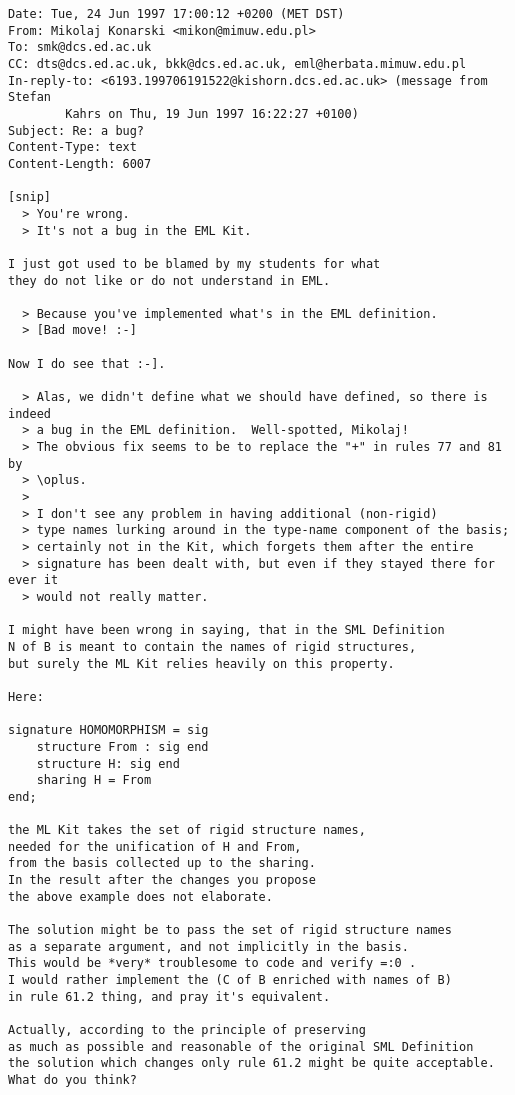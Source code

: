\documentclass[12pt,a4paper]{article}
\begin{document}
{\small\begin{verbatim}
Date: Tue, 24 Jun 1997 17:00:12 +0200 (MET DST)
From: Mikolaj Konarski <mikon@mimuw.edu.pl>
To: smk@dcs.ed.ac.uk
CC: dts@dcs.ed.ac.uk, bkk@dcs.ed.ac.uk, eml@herbata.mimuw.edu.pl
In-reply-to: <6193.199706191522@kishorn.dcs.ed.ac.uk> (message from Stefan
        Kahrs on Thu, 19 Jun 1997 16:22:27 +0100)
Subject: Re: a bug?
Content-Type: text
Content-Length: 6007

[snip]
  > You're wrong.
  > It's not a bug in the EML Kit.

I just got used to be blamed by my students for what
they do not like or do not understand in EML.

  > Because you've implemented what's in the EML definition.
  > [Bad move! :-]

Now I do see that :-].

  > Alas, we didn't define what we should have defined, so there is indeed
  > a bug in the EML definition.  Well-spotted, Mikolaj!
  > The obvious fix seems to be to replace the "+" in rules 77 and 81 by
  > \oplus.
  > 
  > I don't see any problem in having additional (non-rigid)
  > type names lurking around in the type-name component of the basis;
  > certainly not in the Kit, which forgets them after the entire
  > signature has been dealt with, but even if they stayed there for ever it
  > would not really matter.

I might have been wrong in saying, that in the SML Definition
N of B is meant to contain the names of rigid structures,
but surely the ML Kit relies heavily on this property.

Here:

signature HOMOMORPHISM = sig
    structure From : sig end
    structure H: sig end
    sharing H = From 
end;

the ML Kit takes the set of rigid structure names,
needed for the unification of H and From,
from the basis collected up to the sharing.
In the result after the changes you propose
the above example does not elaborate.

The solution might be to pass the set of rigid structure names
as a separate argument, and not implicitly in the basis.
This would be *very* troublesome to code and verify =:0 .
I would rather implement the (C of B enriched with names of B) 
in rule 61.2 thing, and pray it's equivalent.

Actually, according to the principle of preserving
as much as possible and reasonable of the original SML Definition
the solution which changes only rule 61.2 might be quite acceptable. 
What do you think?


\end{verbatim}}
\end{document}
